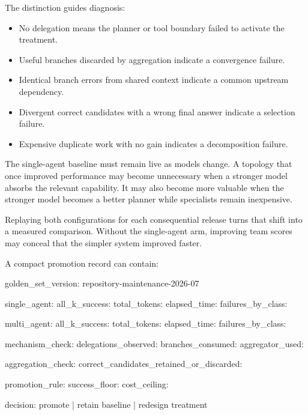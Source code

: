 
The distinction guides diagnosis:

\begin{itemize}
\tightlist
\item
  No delegation means the planner or tool boundary failed to activate the treatment.
\item
  Useful branches discarded by aggregation indicate a convergence failure.
\item
  Identical branch errors from shared context indicate a common upstream dependency.
\item
  Divergent correct candidates with a wrong final answer indicate a selection failure.
\item
  Expensive duplicate work with no gain indicates a decomposition failure.
\end{itemize}

The single-agent baseline must remain live as models change. A topology that once improved performance may become unnecessary when a stronger model absorbs the relevant capability. It may also become more valuable when the stronger model becomes a better planner while specialists remain inexpensive.

Replaying both configurations for each consequential release turns that shift into a measured comparison. Without the single-agent arm, improving team scores may conceal that the simpler system improved faster.

A compact promotion record can contain:

\begin{record}
\begin{recordbody}
golden_set_version: repository-maintenance-2026-07

single_agent:
  all_k_success:
  total_tokens:
  elapsed_time:
  failures_by_class:

multi_agent:
  all_k_success:
  total_tokens:
  elapsed_time:
  failures_by_class:

mechanism_check:
  delegations_observed:
  branches_consumed:
  aggregator_used:

aggregation_check:
  correct_candidates_retained_or_discarded:

promotion_rule:
  success_floor:
  cost_ceiling:

decision:
  promote | retain baseline | redesign treatment
\end{recordbody}
\end{record}

